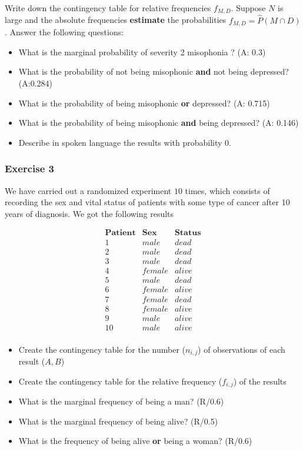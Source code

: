 \documentclass[
]{book}
\providecommand{\tightlist}{%
  \setlength{\itemsep}{0pt}\setlength{\parskip}{0pt}}
\begin{document}
Write down the contingency table for relative frequencies \(f_{ M,D }\). Suppose \(N\) is large and the absolute frequencies \textbf{estimate} the probabilities \(f_{ M,D }=\hat {P}(M \cap D)\). Answer the following questions:

\begin{itemize}
\tightlist
\item
  What is the marginal probability of severity 2 misophonia ? (A: 0.3)
\item
  What is the probability of not being misophonic \textbf{and} not being depressed? (A:0.284)
\item
  What is the probability of being misophonic \textbf{or} depressed? (A: 0.715)
\item
  What is the probability of being misophonic \textbf{and} being depressed? (A: 0.146)
\item
  Describe in spoken language the results with probability 0.
\end{itemize}

\hypertarget{exercise-3}{%
\subsubsection{Exercise 3}\label{exercise-3}}

We have carried out a randomized experiment \(10\) times, which consists of recording the sex and vital status of patients with some type of cancer after 10 years of diagnosis. We got the following results

\[
\begin{array}{ccc}
\mathbf{Patient}   &\mathbf{Sex}   & \mathbf{Status}  \\
1 & male  & dead \\
2 &male  & dead \\
3 &male  & dead \\
4 &female& alive \\
5 &male  & dead \\
6 &female& alive \\
7 &female& dead \\
8 &female& alive \\
9 &male  & alive \\
10 &male  & alive \\
\end{array}
\]

\begin{itemize}
\tightlist
\item
  Create the contingency table for the number (\(n_{ i,j }\)) of observations of each result (\(A,B\))
\item
  Create the contingency table for the relative frequency (\(f_{ i,j }\)) of the results
\item
  What is the marginal frequency of being a man? (R/0.6)
\item
  What is the marginal frequency of being alive? (R/0.5)
\item
  What is the frequency of being alive \textbf{or} being a woman? (R/0.6)
\end{itemize}
\end{document}
